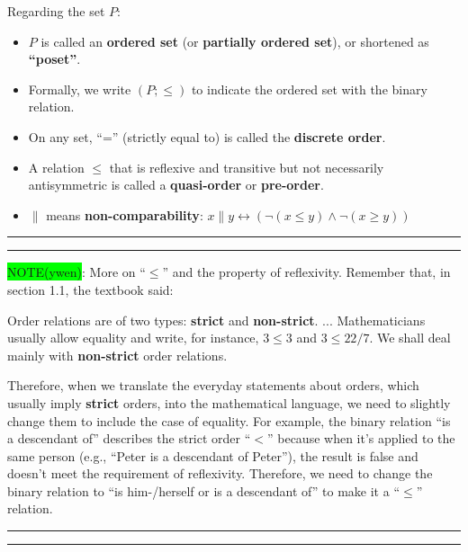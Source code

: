 \documentclass[12pt, letterpaper, oneside]{book}
\begin{document}
Regarding the set $P$:
\begin{itemize}
  \item $P$ is called an \textbf{ordered set} (or \textbf{partially ordered set}), or shortened as \textbf{``poset''}.
  \item Formally, we write $(P; \leqslant)$ to indicate the ordered set with the binary relation.
  \item On any set, ``='' (strictly equal to) is called the \textbf{discrete order}.
  \item A relation $\leqslant$ that is reflexive and transitive but not necessarily antisymmetric is called a
        \textbf{quasi-order} or \textbf{pre-order}.
  \item $\parallel$ means \textbf{non-comparability}: $x \parallel y \leftrightarrow (\lnot (x \leqslant y) \land \lnot (x \geqslant y))$
\end{itemize}

\noindent\rule[-9pt]{1cm}{10pt}\rule{10cm}{0.4pt}

\colorbox{lime}{NOTE(ywen)}: More on ``$\leqslant$'' and the property of reflexivity. Remember that, in section 1.1,
the textbook said:

\begin{displayquote}
  Order relations are of two types: \textbf{strict} and \textbf{non-strict}. ... Mathematicians usually allow equality
  and write, for instance, $3 \leqslant 3$ and $3 \leqslant 22/7$. We shall deal mainly with \textbf{non-strict} order
  relations.
\end{displayquote}

Therefore, when we translate the everyday statements about orders, which usually imply \textbf{strict} orders, into the
mathematical language, we need to slightly change them to include the case of equality. For example, the binary relation
``is a descendant of'' describes the strict order ``$<$'' because when it's applied to the same person (e.g., ``Peter
is a descendant of Peter''), the result is false and doesn't meet the requirement of reflexivity. Therefore, we need to
change the binary relation to ``is him-/herself or is a descendant of'' to make it a ``$\le$'' relation.


\noindent\rule[-9pt]{1cm}{10pt}\rule{10cm}{0.4pt}
\end{document}
